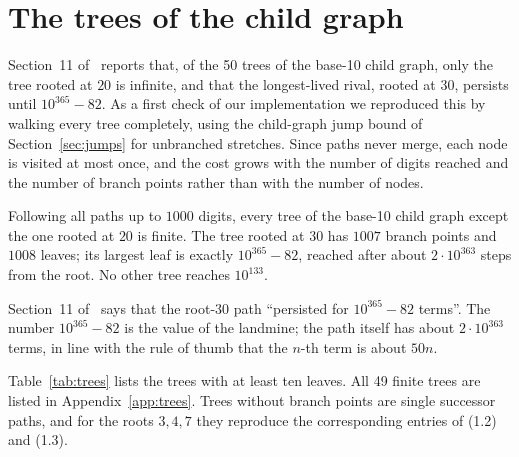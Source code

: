 \section{The trees of the child graph}
\label{sec:trees}

Section~11 of~\cite{comma} reports that, of the 50 trees of the base-10 child graph, only the tree
rooted at $20$ is infinite, and that the longest-lived rival, rooted at $30$, persists until
$10^{365} - 82$. As a first check of our implementation we reproduced this by walking every tree
completely, using the child-graph jump bound of Section~\ref{sec:jumps} for unbranched stretches.
Since paths never merge, each node is visited at most once, and the cost grows with the number of
digits reached and the number of branch points rather than with the number of nodes.

\begin{proposition}
  Following all paths up to $1000$ digits, every tree of the base-10 child graph except the one
  rooted at $20$ is finite. The tree rooted at $30$ has $1007$ branch points and $1008$ leaves; its
  largest leaf is exactly $10^{365} - 82$, reached after about $2 \cdot 10^{363}$ steps from the
  root. No other tree reaches $10^{133}$.
\end{proposition}

\begin{remark}
  Section~11 of~\cite{comma} says that the root-$30$ path ``persisted for $10^{365} - 82$ terms''.
  The number $10^{365} - 82$ is the value of the landmine; the path itself has about
  $2 \cdot 10^{363}$ terms, in line with the rule of thumb that the $n$-th term is about $50 n$.
\end{remark}

Table~\ref{tab:trees} lists the trees with at least ten leaves. All 49 finite trees are listed in
Appendix~\ref{app:trees}. Trees without branch points are single successor paths, and for the roots
$3, 4, 7$ they reproduce the corresponding entries of (1.2) and (1.3).

